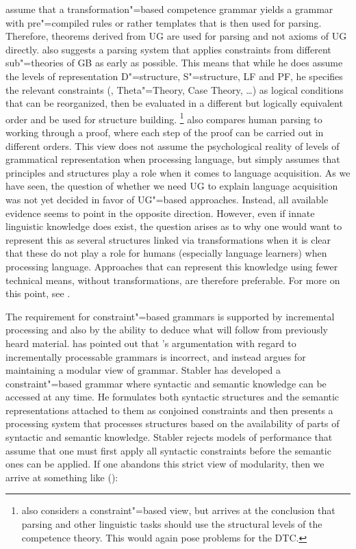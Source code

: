 \addlines
\citet[]{FC96a-u} assume that a transformation"=based competence grammar yields a grammar with pre"=compiled
rules or rather templates that is then used for parsing.
Therefore, theorems derived from UG are used for parsing and not axioms of UG directly.
\citet{Johnson89a} also suggests a parsing system that applies constraints from different sub"=theories of GB as early as possible.
This means that while he does assume the levels of representation D"=structure, S"=structure, LF and PF, he specifies the relevant
constraints (\xbart, Theta"=Theory, Case Theory, \ldots) as logical
conditions that can be reorganized, then be evaluated in a different but logically
equivalent order and be used for structure building.%
\footnote{%
\citet[Section~15.7]{Stabler92a-u} also considers a constraint"=based view, but arrives at the conclusion that parsing and other linguistic
tasks should use the structural levels of the competence theory. This would again pose problems for the DTC.%
}
\citet[]{Chomsky2007a} also compares human parsing to working through a proof, where each step of the proof can be carried out in different
orders. This view does not assume the psychological reality of levels of grammatical representation when processing language, but simply assumes
that principles and structures play a role when it comes to language acquisition. 
As we have seen, the question of whether we need UG to explain language acquisition was not yet decided in favor of UG"=based approaches.
Instead, all available evidence seems to point in the opposite direction. However, even if innate linguistic knowledge does exist, the
question arises as to why one would want to represent this as several structures linked via transformations when it is clear that these do not play
a role for humans (especially language learners) when processing language.
Approaches that can represent this knowledge using fewer technical means, \eg without
transformations, are therefore preferable. For more on this point, see .

The requirement for constraint"=based grammars is supported by incremental processing and also by
the ability to deduce what will follow from previously heard material. \citet{Stabler91a} has pointed
out that \citeauthor{Steedman89b-u}'s \citeyearpar{Steedman89b-u} argumentation with regard to incrementally
processable grammars is incorrect, and instead argues for maintaining a modular view of
grammar. Stabler has developed a constraint"=based grammar where syntactic and semantic
knowledge can be accessed at any time. He formulates both syntactic structures and the semantic
representations attached to them as conjoined constraints and then presents a processing system
that processes structures based on the availability of parts of syntactic and semantic
knowledge. Stabler rejects models of performance that assume that one must first apply all syntactic
constraints before the semantic ones can be applied. If one abandons this strict view of modularity,
then we arrive at something like ():

